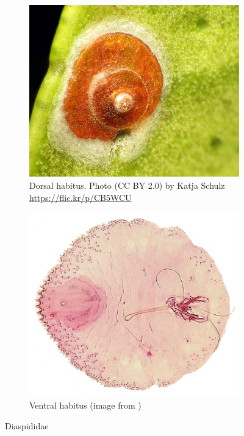 \documentclass[letterpaper, 11pt]{article}
\begin{document}
\begin{figure}[ht!]
 \centering
 \begin{subfigure}[ht!]{0.45\textwidth}
  \includegraphics[width=\textwidth]{DiaspididDorsalHabitus}
  \caption{Dorsal habitus. Photo (CC BY 2.0) by Katja Schulz \url{https://flic.kr/p/CB5WCU}}
  \label{fig:diaspidid1}
 \end{subfigure}
 \qquad
 \begin{subfigure}[ht!]{0.45\textwidth}
  \includegraphics[width=\textwidth]{DiaspididHabitus}
  \caption{Ventral habitus (image from \cite{ScaleNet})}
  \label{fig:diaspidid2}
 \end{subfigure}
 \caption{Diaspididae}\label{fig:diaspidid}
\end{figure}
\end{document}
